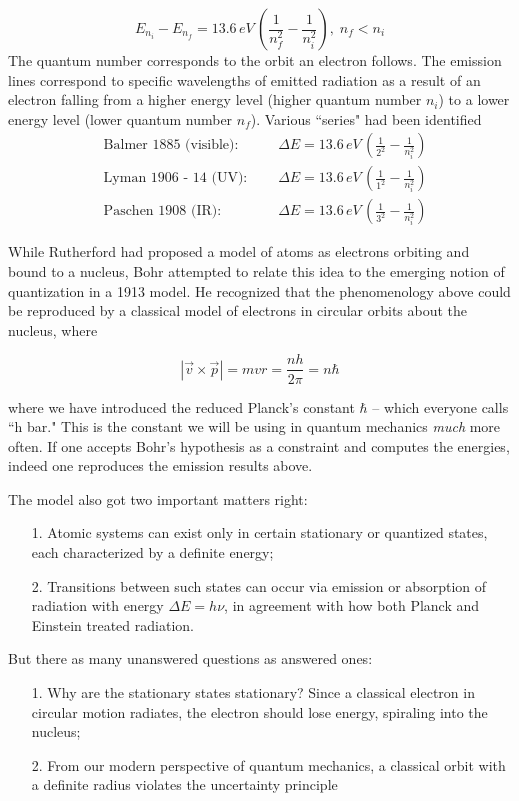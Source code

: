 \[
  E_{n_i} - E_{n_f} = 13.6 \,eV \, \left(\frac{1}{n_f^2} - \frac{1}{n_i^2}
  \right), \; n_f < n_i
\] \vspace{3px}
The quantum number corresponds to the orbit an electron follows. The emission
lines correspond to specific wavelengths of emitted radiation as a result of an
electron falling from a higher energy level (higher quantum number $n_i$) to
a lower energy level (lower quantum number $n_f$). Various ``series" had been identified
\begin{align*}
  &\text{Balmer 1885 (visible): }  &&\; \Delta E = 13.6 \, eV \, \left(
  \frac{1}{2^2} - \frac{1}{n_i^2} \right) \\
  &\text{Lyman 1906 - 14 (UV): } &&\; \Delta E = 13.6 \, eV \, \left(
  \frac{1}{1^2} - \frac{1}{n_i^2} \right) \\
  &\text{Paschen 1908 (IR): } &&\; \Delta E = 13.6 \, eV \, \left(
  \frac{1}{3^2} - \frac{1}{n_i^2} \right) 
\end{align*}

While Rutherford had proposed a model of atoms as electrons orbiting and bound
to a nucleus, Bohr attempted to relate this idea to the emerging notion of
quantization in a 1913 model. He recognized that the phenomenology above could
be reproduced by a classical model of electrons in circular orbits about the
nucleus, where 

\[
|\vec{v} \times \vec{p}| = mvr = \frac{nh}{2\pi} = n\hbar
\] \vspace{3px}

where we have introduced the reduced Planck's constant $\hbar$ -- which
everyone calls ``h bar." This is the constant we will be using in quantum
mechanics \textit{much} more often. If one accepts Bohr's hypothesis as
a constraint and computes the energies, indeed one reproduces the emission
results above. 

The model also got two important matters right: 

\begin{itemize}
  \item[1.] Atomic systems can exist only in certain stationary or quantized
    states, each characterized by a definite energy; 
  \item[2.] Transitions between such states can occur via emission or
    absorption of radiation with energy $\Delta E= h\nu$, in agreement with how
    both Planck and Einstein treated radiation. 
\end{itemize}

But there as many unanswered questions as answered ones: 
\begin{itemize}
  \item[1.] Why are the stationary states stationary? Since a classical
    electron in circular motion radiates, the electron should lose energy,
    spiraling into the nucleus; 
  \item[2.] From our modern perspective of quantum mechanics, a classical orbit
    with a definite radius violates the uncertainty principle
\end{itemize}

